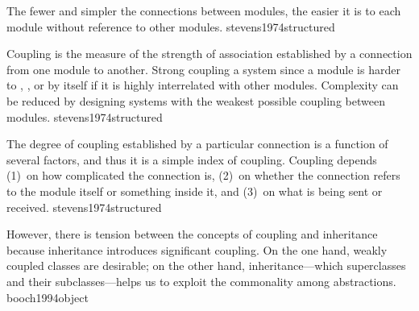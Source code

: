 \documentclass{article}
\begin{document}


  {The fewer and simpler the connections between modules, the easier it is to  each module without reference to other modules.}
  {stevens1974structured}


  {Coupling is the measure of the strength of association established by a connection from one module to another. Strong coupling  a system since a module is harder to , , or  by itself if it is highly interrelated with other modules. Complexity can be reduced by designing systems with the weakest possible coupling between modules.}
  {stevens1974structured}


  {The degree of coupling established by a particular connection is a function of several factors, and thus it is  a simple index of coupling. Coupling depends (1)~on how complicated the connection is, (2)~on whether the connection refers to the module itself or something inside it, and (3)~on what is being sent or received.}
  {stevens1974structured}



  {However, there is tension between the concepts of coupling and inheritance because inheritance introduces significant coupling. On the one hand, weakly coupled classes are desirable; on the other hand, inheritance---which  superclasses and their subclasses---helps us to exploit the commonality among abstractions.}
  {booch1994object}
\end{document}
